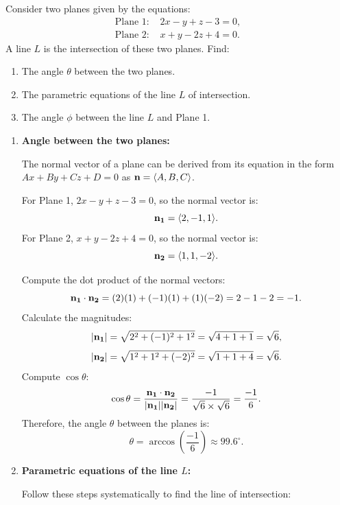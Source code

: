 \exampleline
\begin{example}
Consider two planes given by the equations:
\[
\begin{aligned}
\text{Plane 1: } & 2x - y + z - 3 = 0, \\
\text{Plane 2: } & x + y - 2z + 4 = 0.
\end{aligned}
\]
A line \( L \) is the intersection of these two planes. Find:
\begin{enumerate}
    \item The angle \( \theta \) between the two planes.
    \item The parametric equations of the line \( L \) of intersection.
    \item The angle \( \phi \) between the line \( L \) and Plane 1.
\end{enumerate}

\begin{solution}
\begin{enumerate}
    \item \textbf{Angle between the two planes:}
    
    \noindent The normal vector of a plane can be derived from its equation in the form \( Ax + By + Cz + D = 0 \) as \( \vb{n} = \langle A, B, C \rangle \).
    
    For Plane 1, \( 2x - y + z - 3 = 0 \), so the normal vector is:
    \[
    \vb{n_1} = \langle 2, -1, 1 \rangle.
    \]
    For Plane 2, \( x + y - 2z + 4 = 0 \), so the normal vector is:
    \[
    \vb{n_2} = \langle 1, 1, -2 \rangle.
    \]
    
    Compute the dot product of the normal vectors:
    \[
    \vb{n_1} \cdot \vb{n_2} = (2)(1) + (-1)(1) + (1)(-2) = 2 - 1 - 2 = -1.
    \]
    Calculate the magnitudes:
    \[
    |\vb{n_1}| = \sqrt{2^2 + (-1)^2 + 1^2} = \sqrt{4 + 1 + 1} = \sqrt{6},
    \]
    \[
    |\vb{n_2}| = \sqrt{1^2 + 1^2 + (-2)^2} = \sqrt{1 + 1 + 4} = \sqrt{6}.
    \]
    Compute \( \cos \theta \):
    \[
    \cos \theta = \frac{\vb{n_1} \cdot \vb{n_2}}{|\vb{n_1}| |\vb{n_2}|} = \frac{-1}{\sqrt{6} \times \sqrt{6}} = \frac{-1}{6}.
    \]
    Therefore, the angle \( \theta \) between the planes is:
    \[
    \theta = \arccos\left( \frac{-1}{6} \right) \approx 99.6^\circ.
    \]
    
    \item \textbf{Parametric equations of the line \( L \):}
    
    \noindent Follow these steps systematically to find the line of intersection:


\end{enumerate}
\end{solution}
\end{example}
